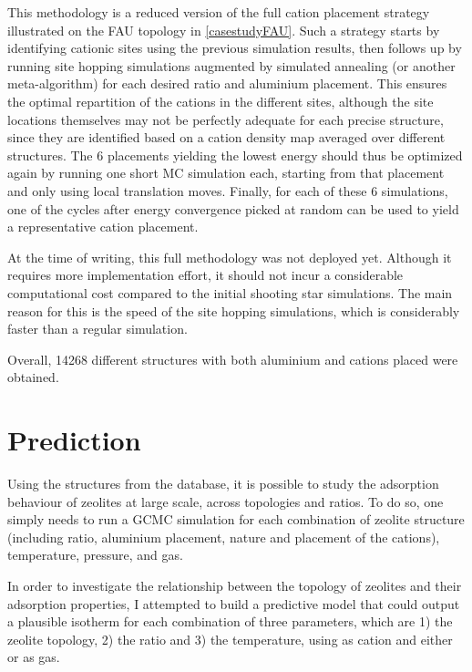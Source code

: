 \documentclass[main.tex]{subfiles}
\begin{document}
This methodology is a reduced version of the full cation placement strategy illustrated on the FAU topology in \cref{casestudyFAU}. Such a strategy starts by identifying cationic sites using the previous simulation results, then follows up by running site hopping simulations augmented by simulated annealing (or another meta-algorithm) for each desired \SiAl ratio and aluminium placement. This ensures the optimal repartition of the cations in the different sites, although the site locations themselves may not be perfectly adequate for each precise structure, since they are identified based on a cation density map averaged over different structures. The 6 placements yielding the lowest energy should thus be optimized again by running one short MC simulation each, starting from that placement and only using local translation moves. Finally, for each of these 6 simulations, one of the cycles after energy convergence picked at random can be used to yield a representative cation placement.

At the time of writing, this full methodology was not deployed yet. Although it requires more implementation effort, it should not incur a considerable computational cost compared to the initial shooting star simulations. The main reason for this is the speed of the site hopping simulations, which is considerably faster than a regular simulation.

Overall, \num{14268} different structures with both aluminium and cations placed were obtained.


\section{Prediction}

Using the structures from the database, it is possible to study the adsorption behaviour of zeolites at large scale, across topologies and \SiAl ratios. To do so, one simply needs to run a GCMC simulation for each combination of zeolite structure (including \SiAl ratio, aluminium placement, nature and placement of the cations), temperature, pressure, and gas.

In order to investigate the relationship between the topology of zeolites and their adsorption properties, I attempted to build a predictive model that could output a plausible isotherm for each combination of three parameters, which are 1) the zeolite topology, 2) the \SiAl ratio and 3) the temperature, using  as cation and either  or  as gas.
\end{document}
